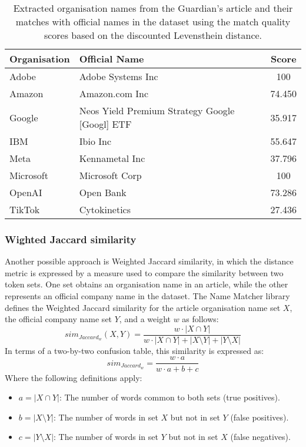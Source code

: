 \begin{table}[ht]
    \centering
    \caption{Extracted organisation names from the Guardian's article and their matches with official names in the dataset using the match quality scores based on the discounted Levensthein distance.}
    \label{table:discounted-levenshtein-distance}
    \begin{tabular}{l l c}
        \hline
        Organisation & Official Name & Score \\
        \hline
        Adobe & Adobe Systems Inc & 100 \\
        Amazon & Amazon.com Inc & 74.450 \\
        Google & Neos Yield Premium Strategy Google [Googl] ETF & 35.917 \\
        IBM & Ibio Inc & 55.647 \\
        Meta & Kennametal Inc & 37.796 \\
        Microsoft & Microsoft Corp & 100 \\
        OpenAI & Open Bank & 73.286 \\
        TikTok & Cytokinetics & 27.436 \\
        \hline
    \end{tabular}
\end{table}

\subsubsection*{Wighted Jaccard similarity}
\label{subsubsec:wighted-jaccard-similarity}
Another possible approach is Weighted Jaccard similarity, in which the distance metric is expressed by a measure used to compare the similarity between two token sets. One set obtains an organisation name in an article, while the other represents an official company name in the dataset. The Name Matcher library defines the Weighted Jaccard similarity for the article organisation name set $X$, the official company name set $Y$, and a weight $w$ as follows:
\begin{equation}
    \label{eq:weighted-jaccard-similarity}
    sim_{Jaccard_w}(X, Y) = \frac{w \cdot |X \cap Y|}
    {w \cdot |X \cap Y| + |X \setminus Y| + |Y \setminus X|}
\end{equation}
In terms of a two-by-two confusion table, this similarity is expressed as:
\begin{equation}
    sim_{Jaccard_w} = \frac{w\cdot a}{w\cdot a+b+c}
\end{equation}
Where the following definitions apply:
\begin{itemize}
    \item $a = |X \cap Y|$: The number of words common to both sets (true positives).
    \item $b = |X \setminus Y|$: The number of words in set $X$ but not in set $Y$ (false positives).
    \item $c = |Y \setminus X|$: The number of words in set $Y$ but not in set $X$ (false negatives).
\end{itemize}

